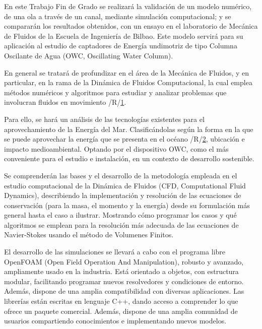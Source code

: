 En este Trabajo Fin de Grado se realizará la validación de un modelo
numérico, de una ola a través de un canal, mediante simulación
computacional; y se compararán los resultados obtenidos, con un ensayo
en el laboratorio de Mecánica de Fluidos de la Escuela de Ingeniería de
Bilbao. Este modelo servirá para su aplicación al estudio de captadores
de Energía undimotriz de tipo Columna Oscilante de Agua (OWC,
Oscillating Water Column).

En general se tratará de profundizar en el área de la Mecánica de
Fluidos, y en particular, en la rama de la Dinámica de Fluidos
Computacional, la cual emplea métodos numéricos y algoritmos para
estudiar y analizar problemas que involucran fluidos en movimiento
/R/\href{Orrego,\%20S;\%20\%22Simulación\%20de\%20fluidos\%20utilizando\%20computadores:\%20una\%20moderna\%20herraamienta\%20para\%20el\%20estudio\%20y\%20análisis\%20de\%20fluidos\%22;\%20Grupo\%20de\%20Investigación\%20Mecánica\%20Aplicada;\%20Universidad\%20EAFIT,\%20Colombia;\%20noviembre\%202009}{1}.

Para ello, se hará un análisis de las tecnologías existentes para el
aprovechamiento de la Energía del Mar. Clasificándolas según la forma en
la que se puede aprovechar la energía que se presenta en el océano
/R/\href{Amundarain,\%20M.\%20(2012).\%20\%22La\%20energía\%20renovable\%20procedente\%20de\%20las\%20olas\%22;\%20Ikastorratza,\%20e-Revista\%20de\%20Didáctica\%208,\%20Retrieved\%202012/02/25\%20from\%20http://www.ehu.es/ikastorratza/8_alea/energia/energia.pdf\%20(ISSN:1988-5911)}{2},
ubicación e impacto medioambiental. Optando por el dispositivo OWC, como
el más conveniente para el estudio e instalación, en un contexto de
desarrollo sostenible.

Se comprenderán las bases y el desarrollo de la metodología empleada en
el estudio computacional de la Dinámica de Fluidos (CFD, Computational
Fluid Dynamics), describiendo la implementación y resolución de las
ecuaciones de conservación (para la masa, el momento y la energía) desde
su formulación más general hasta el caso a ilustrar. Mostrando cómo
programar los casos y qué algoritmos se emplean para la resolución más
adecuada de las ecuaciones de Navier-Stokes usando el método de
Volumenes Finitos.

El desarrollo de las simulaciones se llevará a cabo con el programa
libre OpenFOAM (Open Field Operation And Manipulation), robusto y
avanzado, ampliamente usado en la industria. Está orientado a objetos,
con estructura modular, facilitando programar nuevos resolvedores y
condiciones de entorno. Además, dispone de una amplia compatibilidad con
diversas aplicaciones. Las librerías están escritas en lenguaje C++,
dando acceso a comprender lo que ofrece un paquete comercial. Además,
dispone de una amplia comunidad de usuarios compartiendo conocimientos e
implementando nuevos modelos.

